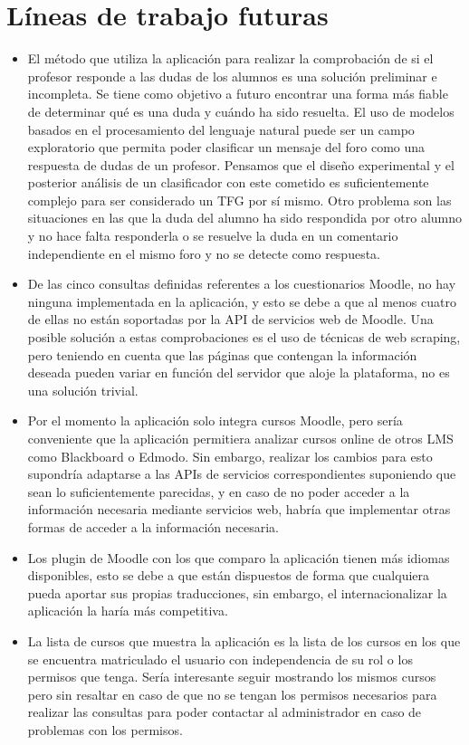 \section{Líneas de trabajo futuras}
\begin{itemize}
	\item
	El método que utiliza la aplicación para realizar la comprobación de si el profesor responde a las dudas de los alumnos es una solución preliminar e incompleta. Se tiene como objetivo a futuro encontrar una forma más fiable de determinar qué es una duda y cuándo ha sido resuelta.
	El uso de modelos basados en el procesamiento del lenguaje natural puede ser un campo exploratorio que permita poder clasificar un mensaje del foro como una respuesta de dudas de un profesor. Pensamos que el diseño experimental y el posterior análisis de un clasificador con este cometido es suficientemente complejo para ser considerado un TFG por sí mismo. Otro problema son las situaciones en las que la duda del alumno ha sido respondida por otro alumno y no hace falta responderla o se resuelve la duda en un comentario independiente en el mismo foro y no se detecte como respuesta.
	\item
	De las cinco consultas definidas referentes a los cuestionarios Moodle, no hay ninguna implementada en la aplicación, y esto se debe a que al menos cuatro de ellas no están soportadas por la API de servicios web de Moodle.
	Una posible solución a estas comprobaciones es el uso de técnicas de web scraping, pero teniendo en cuenta que las páginas que contengan la información deseada pueden variar en función del servidor que aloje la plataforma, no es una solución trivial.
	\item
	Por el momento la aplicación solo integra cursos Moodle, pero sería conveniente que la aplicación permitiera analizar cursos online de otros LMS como Blackboard o Edmodo. Sin embargo, realizar los cambios para esto supondría adaptarse a las APIs de servicios correspondientes suponiendo que sean lo suficientemente parecidas, y en caso de no poder acceder a la información necesaria mediante servicios web, habría que implementar otras formas de acceder a la información necesaria.
	\item
	Los plugin de Moodle con los que comparo la aplicación tienen más idiomas disponibles, esto se debe a que están dispuestos de forma que cualquiera pueda aportar sus propias traducciones, sin embargo, el internacionalizar la aplicación la haría más competitiva.
	\item
	La lista de cursos que muestra la aplicación es la lista de los cursos en los que se encuentra matriculado el usuario con independencia de su rol o los permisos que tenga. Sería interesante seguir mostrando los mismos cursos pero sin resaltar en caso de que no se tengan los permisos necesarios para realizar las consultas para poder contactar al administrador en caso de problemas con los permisos.

\end{itemize}
